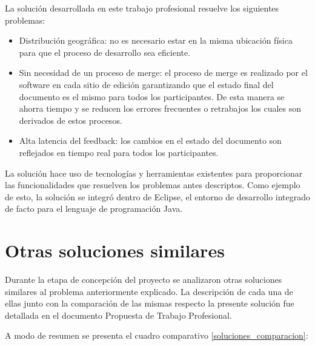 \documentclass[12pt,a4paper]{article}
\begin{document}
La solución desarrollada en este trabajo profesional resuelve los siguientes problemas:

\begin{itemize}
	\item Distribución geográfica: no es necesario estar en la misma ubicación física para que el proceso
	de desarrollo sea eficiente.
	\item Sin necesidad de un proceso de merge: el proceso de merge es realizado por el software en cada
	sitio de edición garantizando que el estado final del documento es el mismo para todos los 
	participantes. De esta manera se ahorra tiempo y se reducen los errores frecuentes o retrabajos
	los cuales son derivados de estos procesos.
	\item Alta latencia del feedback: los cambios en el estado del documento son reflejados en tiempo 
	real para todos los participantes.
\end{itemize}

La solución hace uso de tecnologías y herramientas existentes para proporcionar las funcionalidades 
que resuelven los problemas antes descriptos. Como ejemplo de esto, la solución se integró dentro de
Eclipse, el entorno de desarrollo integrado de facto para el lenguaje de programación Java.

	\section{Otras soluciones similares}
Durante la etapa de concepción del proyecto se analizaron otras soluciones similares al problema
anteriormente explicado. La descripción de cada una de ellas junto con la comparación de las mismas
respecto la presente solución fue detallada en el documento Propuesta de Trabajo Profesional. %

A modo de resumen se presenta el cuadro comparativo \ref{soluciones_comparacion}:
\end{document}
